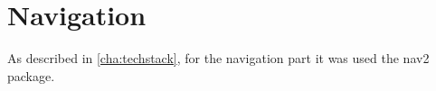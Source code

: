 \chapter{Navigation}



As described in \autoref{cha:techstack}, for the navigation part it was used the \Acrshort{nav2} package. 